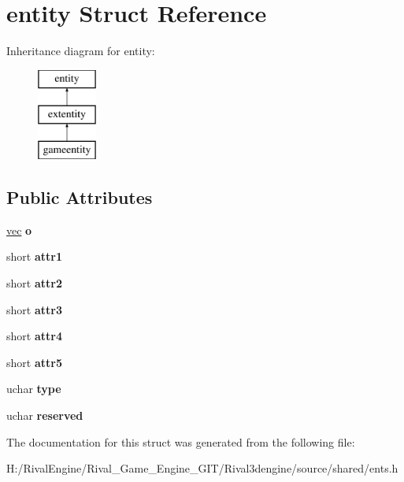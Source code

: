 \hypertarget{structentity}{}\section{entity Struct Reference}
\label{structentity}
Inheritance diagram for entity\+:\begin{figure}[H]
\begin{center}
\leavevmode
\includegraphics[height=3.000000cm]{structentity}
\end{center}
\end{figure}
\subsection*{Public Attributes}
\begin{DoxyCompactItemize}
\item 
\mbox{\label{structentity_a525c90c5512cbb504f7ac9ab7014336f}} 
\hyperlink{structvec}{vec} {\bfseries o}
\item 
\mbox{\label{structentity_a0906ab7e340820c4207da45e572c0525}} 
short {\bfseries attr1}
\item 
\mbox{\label{structentity_aadcc9c36f34cd97cb9104dfcba3837e1}} 
short {\bfseries attr2}
\item 
\mbox{\label{structentity_a84d04e109e32479542f0495fdc30c2e3}} 
short {\bfseries attr3}
\item 
\mbox{\label{structentity_a33825bffeac8465cdeb6a6e37fa460c6}} 
short {\bfseries attr4}
\item 
\mbox{\label{structentity_a70fab3b3b43a8fa51e997d7b13d74dac}} 
short {\bfseries attr5}
\item 
\mbox{\label{structentity_a8149790bddae92665ede0d60432f2dee}} 
uchar {\bfseries type}
\item 
\mbox{\label{structentity_af1b78967a757632a36536216c3ec9269}} 
uchar {\bfseries reserved}
\end{DoxyCompactItemize}


The documentation for this struct was generated from the following file\+:\begin{DoxyCompactItemize}
\item 
H\+:/\+Rival\+Engine/\+Rival\+\_\+\+Game\+\_\+\+Engine\+\_\+\+G\+I\+T/\+Rival3dengine/source/shared/ents.\+h\end{DoxyCompactItemize}
